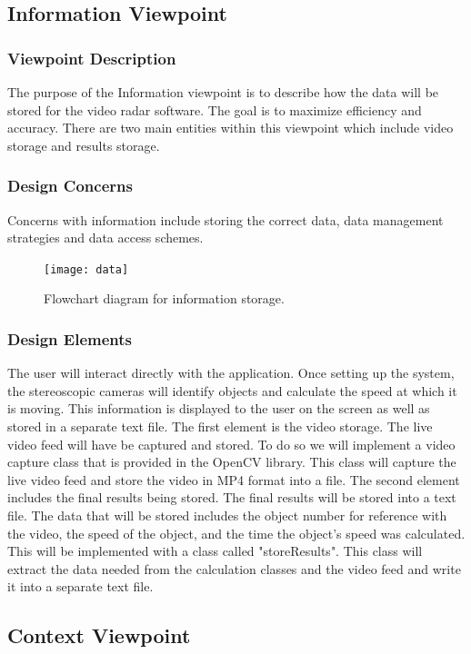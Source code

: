 \documentclass[letterpaper,10pt,onecolumn,draftclsnofoot]{IEEEtran}
\begin{document}
\subsection{Information Viewpoint}
\subsubsection{Viewpoint Description}
The purpose of the Information viewpoint is to describe how the data will be stored for the video radar software. The goal is to maximize efficiency and accuracy. There are two main entities within this viewpoint which include video storage and results storage.

\subsubsection{Design Concerns} 
Concerns with information include storing the correct data, data management strategies and data access schemes.

\begin{figure}[H]
\texttt{[image: data]}
\caption{Flowchart diagram for information storage.}
\label{fig:data}
\end{figure}

\subsubsection{Design Elements}
The user will interact directly with the application.
Once setting up the system, the stereoscopic cameras will identify objects and calculate the speed at which it is moving.
This information is displayed to the user on the screen as well as stored in a separate text file.
The first element is the video storage.
The live video feed will have be captured and stored.
To do so we will implement a video capture class that is provided in the OpenCV library.
This class will capture the live video feed and store the video in MP4 format into a file.
The second element includes the final results being stored.
The final results will be stored into a text file.
The data that will be stored includes the object number for reference with the video, the speed of the object, and the time the object's speed was calculated.
This will be implemented with a class called "storeResults".
This class will extract the data needed from the calculation classes and the video feed and write it into a separate text file.

\subsection{Context Viewpoint}
\end{document}
